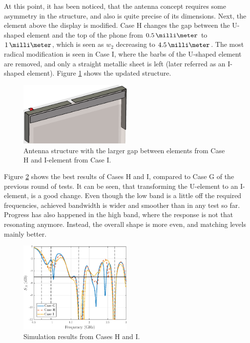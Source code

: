 At this point, it has been noticed, that the antenna concept requires some asymmetry in the structure, and also is quite precise of its dimensions. Next, the element above the display is modified. Case H changes the gap between the U-shaped element and the top of the phone from $0.5\,\milli\meter$ to $1\,\milli\meter$, which is seen as $w_2$ decreasing to $4.5\,\milli\meter$. The most radical modification is seen in Case I, where the barbs of the U-shaped element are removed, and only a straight metallic sheet is left (later referred as an I-shaped element). Figure \ref{fig:concept_i_shape} shows the updated structure.
\begin{figure}[H]
    \centering
    \includegraphics[width=0.5\textwidth]{img/concept_i_shape.eps}
    \caption{Antenna structure with the larger gap between elements from Case H and I-element from Case I.}
    \label{fig:concept_i_shape}
\end{figure}

Figure \ref{fig:concept4} shows the best results of Cases H and I, compared to Case G of the previous round of tests. It can be seen, that transforming the U-element to an I-element, is a good change. Even though the low band is a little off the required frequencies, achieved bandwidth is wider and smoother than in any test so far. Progress has also happened in the high band, where the response is not that resonating anymore. Instead, the overall shape is more even, and matching levels mainly better.
\begin{figure}[H]
    \centering
    \includegraphics[width=0.5\textwidth]{img/concept4.eps}
    \caption{Simulation results from Cases H and I.}
    \label{fig:concept4}
\end{figure}


